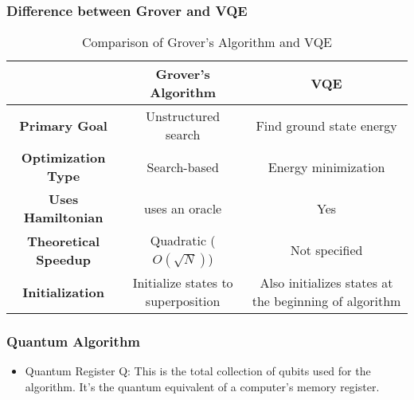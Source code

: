 \documentclass{Assignment}
\begin{document}
\subsubsection*{Difference between Grover and VQE}
\begin{table}[hbt!]
	\centering
	\caption{Comparison of Grover's Algorithm and VQE}
	\label{tab:grover_vqe_comparison}
	\begin{adjustbox}{max width=\textwidth}
		\begin{tabular}{|c|c|c|}
			\toprule
		
			& \textbf{Grover's Algorithm} & \textbf{VQE} \\
			\midrule
			\textbf{Primary Goal} & Unstructured search & Find ground state energy \\
			\hline
			\textbf{Optimization Type} & Search-based & Energy minimization \\
			\hline
			\textbf{Uses Hamiltonian} &uses an oracle & Yes \\
			\hline
			\textbf{Theoretical Speedup} & Quadratic ($O(\sqrt{N})$) & Not specified\\
	
			\hline
			\textbf{Initialization} & Initialize states to superposition & Also initializes states at the beginning of algorithm  \\
			\bottomrule
		\end{tabular}
	\end{adjustbox}
\end{table}
\newpage
\subsubsection*{Quantum Algorithm \cite{PhysRevA.93.032301}}
\begin{itemize}
	\item  Quantum Register Q: This is the total collection of qubits used for the algorithm. It's the quantum equivalent of a computer's memory register.
\end{itemize}
\newpage

\end{document}

